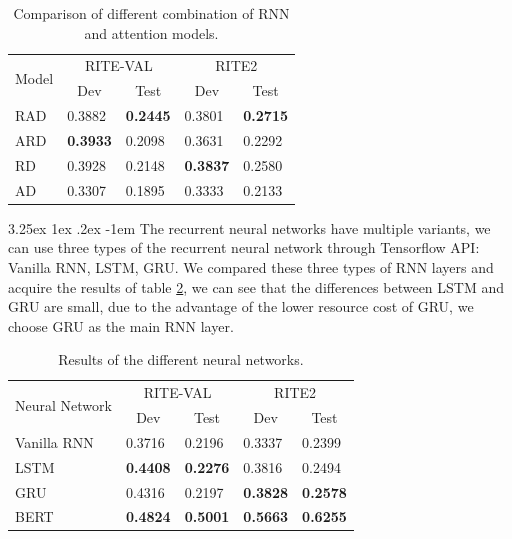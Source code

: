 \documentclass[12pt]{article}
\makeatletter
\renewcommand\paragraph{\@startsection{paragraph}{5}{\z@}%
  {3.25ex \@plus1ex \@minus.2ex}%
  {-1em}%
  {\normalfont\normalsize\bfseries}}
\makeatother
\begin{document}
\begin{CJK*}{UTF8}{bkai}
\begin{spacing}{1.77}
\begin{table}[H]
  \centering
  \setlength{\extrarowheight}{-3pt}
  \begin{tabular}{|l|l|l|l|l|}
  \hline
  \multicolumn{1}{|c|}{\multirow{2}{*}{Model}} & \multicolumn{2}{c|}{RITE-VAL} & \multicolumn{2}{c|}{RITE2} \\ \cline{2-5}
  \multicolumn{1}{|c|}{} & \multicolumn{1}{c|}{Dev} & \multicolumn{1}{c|}{Test} & \multicolumn{1}{c|}{Dev} & \multicolumn{1}{c|}{Test} \\ \hline
  RAD & 0.3882 & \textbf{0.2445} & 0.3801 & \textbf{0.2715} \\ \hline
  ARD & \textbf{0.3933} & 0.2098 & 0.3631 & 0.2292 \\ \hline
  RD & 0.3928 & 0.2148 & \textbf{0.3837} & 0.2580 \\ \hline
  AD & 0.3307 & 0.1895 & 0.3333 & 0.2133 \\ \hline
  \end{tabular}
  \caption{Comparison of different combination of RNN and attention models.}
  \label{result:nn_types_comparison}
\end{table}

\paragraph{}
The recurrent neural networks have multiple variants, we can use three types of the recurrent neural network through Tensorflow API: Vanilla RNN, LSTM, GRU. We compared these three types of RNN layers and acquire the results of table \ref{result:rnn_types}, we can see that the differences between LSTM and GRU are small, due to the advantage of the lower resource cost of GRU, we choose GRU as the main RNN layer.

\begin{table}[H]
  \centering
  \setlength{\extrarowheight}{-3pt}
  \begin{tabular}{|l|l|l|l|l|}
  \hline
  \multirow{2}{*}{Neural Network} & \multicolumn{2}{c|}{RITE-VAL} & \multicolumn{2}{c|}{RITE2} \\ \cline{2-5}
   & \multicolumn{1}{c|}{Dev} & \multicolumn{1}{c|}{Test} & \multicolumn{1}{c|}{Dev} & \multicolumn{1}{c|}{Test} \\ \hline
  Vanilla RNN & 0.3716 & 0.2196 & 0.3337 & 0.2399 \\ \hline
  LSTM & \textbf{0.4408} & \textbf{0.2276} & 0.3816 & 0.2494 \\ \hline
  GRU & 0.4316 & 0.2197 & \textbf{0.3828} & \textbf{0.2578} \\ \hline
  BERT & \textbf{0.4824} & \textbf{0.5001} & \textbf{0.5663} & \textbf{0.6255} \\ \hline
  \end{tabular}
  \caption{Results of the different neural networks.}
  \label{result:rnn_types}
\end{table}


\end{spacing}
\end{CJK*}
\end{document}
